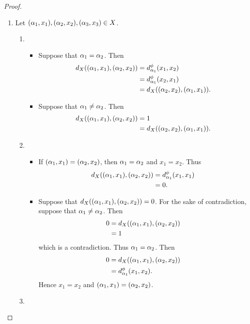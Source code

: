 \documentclass{book}
\begin{document}
\begin{proof}\
	\begin{enumerate}
		\item Let $(\alpha_1, x_1), (\alpha_2, x_2), (\alpha_3, x_3) \in X$. 
		\begin{enumerate}
			\item 
			\begin{itemize}
				\item Suppose that $\alpha_1 = \alpha_2$. Then 
				\begin{align*}
					d_X((\alpha_1, x_1), (\alpha_2, x_2))
					& = d_{\alpha_1}^{\phi}(x_1, x_2) \\
					& = d_{\alpha_1}^{\phi}(x_2, x_1) \\
					& = d_X((\alpha_2, x_2), (\alpha_1, x_1)).
				\end{align*}
				\item Suppose that $\alpha_1 \neq \alpha_2$. Then 
				\begin{align*}
					d_X((\alpha_1, x_1), (\alpha_2, x_2))
					& = 1 \\
					& = d_X((\alpha_2, x_2), (\alpha_1, x_1)).
				\end{align*}
			\end{itemize}
			\item 
			\begin{itemize}
				\item If $(\alpha_1, x_1) = (\alpha_2, x_2)$, then $\alpha_1 = \alpha_2$ and $x_1 = x_2$. Thus 
				\begin{align*}
					d_X((\alpha_1, x_1), (\alpha_2, x_2))
					& = d_{\alpha_1}^{\phi}(x_1, x_1) \\
					& = 0.
				\end{align*}
				\item Suppose that $d_X((\alpha_1, x_1), (\alpha_2, x_2)) = 0$. 
				For the sake of contradiction, suppose that $\alpha_1 \neq \alpha_2$. Then
				\begin{align*}
					0
					& = d_X((\alpha_1, x_1), (\alpha_2, x_2)) \\
					& = 1
				\end{align*} 
				which is a contradiction. Thus $\alpha_1 = \alpha_2$. Then
				\begin{align*}
					0
					& = d_X((\alpha_1, x_1), (\alpha_2, x_2)) \\
					& = d_{\alpha_1}^{\phi}(x_1, x_2).
				\end{align*} 
				Hence $x_1 = x_2$ and $(\alpha_1, x_1) = (\alpha_2, x_2)$.
			\end{itemize}
			\item 
			\begin{itemize}

\end{itemize}
\end{enumerate}
\end{enumerate}
\end{proof}
\end{document}
